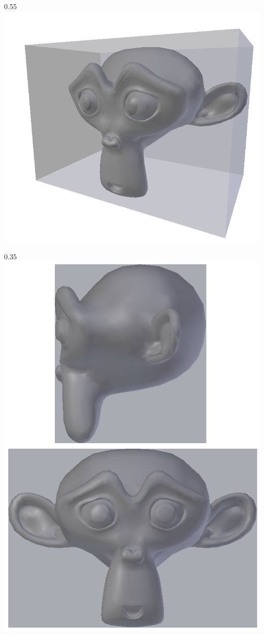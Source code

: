 \begin{figureth}
	\begin{subfigureth}{0.55\textwidth}
		\includegraphics[width=\linewidth]{images/boiteenglobante}
		\label{boîteenglobante}
	\end{subfigureth}
	\qquad
	\begin{subfigureth}{0.35\textwidth}
		\includegraphics[width=\linewidth]{images/boiteenglobante2}

\end{subfigureth}
\end{figureth}
